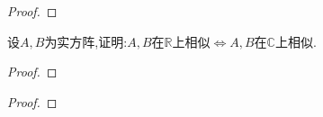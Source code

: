 \begin{proof}
    
\end{proof}

\begin{problem}
    设$A,B$为实方阵,证明:$A,B$在$\mathbb{R}$上相似$\Leftrightarrow$$A,B$在$\mathbb{C}$上相似.
\end{problem}

\begin{proof}
    
\end{proof}



\begin{problem}
    
\end{problem}

\begin{solution}
    
\end{solution}

\begin{problem}
    
\end{problem}

\begin{proof}
    
\end{proof}